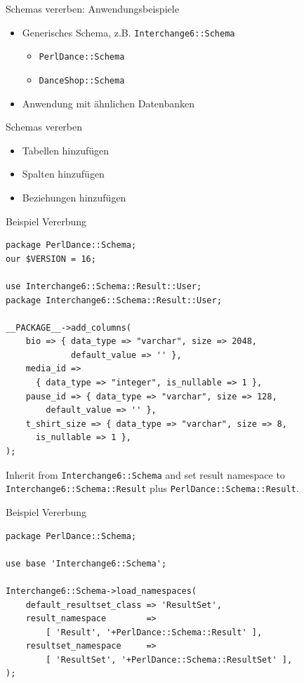 \begin{frame}[fragile]{Schemas vererben: Anwendungsbeispiele}
\begin{itemize}
\item Generisches Schema, z.B. \verb|Interchange6::Schema|
  \begin{itemize}
  \item \verb|PerlDance::Schema|
  \item \verb|DanceShop::Schema|
  \end{itemize}
\item Anwendung mit ähnlichen Datenbanken
\end{itemize}
\end{frame}

\begin{frame}{Schemas vererben}
\begin{itemize}
\item Tabellen hinzufügen
\item Spalten hinzufügen
\item Beziehungen hinzufügen
\end{itemize}
\end{frame}

\begin{frame}[fragile]{Beispiel Vererbung}
\begin{lstlisting}
package PerlDance::Schema;
our $VERSION = 16;

use Interchange6::Schema::Result::User;
package Interchange6::Schema::Result::User;

__PACKAGE__->add_columns(
    bio => { data_type => "varchar", size => 2048, 
             default_value => '' },
    media_id =>
      { data_type => "integer", is_nullable => 1 },
    pause_id => { data_type => "varchar", size => 128, 
        default_value => '' },
    t_shirt_size => { data_type => "varchar", size => 8, 
      is_nullable => 1 },
);
\end{lstlisting}
\end{frame}

Inherit from \verb|Interchange6::Schema| and set result namespace to 
\verb|Interchange6::Schema::Result| plus \verb|PerlDance::Schema::Result|.

\begin{frame}[fragile]{Beispiel Vererbung}
\begin{lstlisting}
package PerlDance::Schema;

use base 'Interchange6::Schema';

Interchange6::Schema->load_namespaces(
    default_resultset_class => 'ResultSet',
    result_namespace        =>
        [ 'Result', '+PerlDance::Schema::Result' ],
    resultset_namespace     =>
        [ 'ResultSet', '+PerlDance::Schema::ResultSet' ],
);
\end{lstlisting}
\end{frame}


